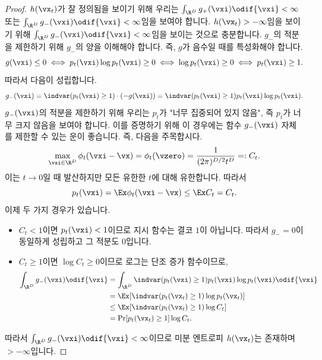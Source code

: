 \documentclass[../../book-main_ko.tex]{subfiles}
\begin{document}
\begin{proof}
    \(h(\vx_{t})\)가 잘 정의됨을 보이기 위해 우리는 \(\int_{\R^{D}}g_{+}(\vxi)\odif{\vxi} < \infty\) 또는 \(\int_{\R^{D}}g_{-}(\vxi) \odif{\vxi} < \infty\)임을 보여야 합니다. \(h(\vx_{t}) > -\infty\)임을 보이기 위해 \(\int_{\R^{D}}g_{-}(\vxi)\odif{\vxi} < \infty\)임을 보이는 것으로 충분합니다. \(g_{-}\)의 적분을 제한하기 위해 \(g_{-}\)의 양을 이해해야 합니다. 즉, \(g\)가 음수일 때를 특성화해야 합니다.
    \begin{equation}
        g(\vxi) \leq 0 \iff p_{t}(\vxi)\log p_{t}(\vxi) \geq 0 \iff \log p_{t}(\vxi) \geq 0 \iff p_{t}(\vxi) \geq 1.
    \end{equation}
    따라서 다음이 성립합니다.
    \begin{equation}
        g_{-}(\vxi) = \indvar(p_{t}(\vxi) \geq 1)\cdot (-g(\vxi)) = \indvar(p_{t}(\vxi) \geq 1)p_{t}(\vxi)\log p_{t}(\vxi).
    \end{equation}
    \(g_{-}(\vxi)\)의 적분을 제한하기 위해 우리는 \(p_{t}\)가 "너무 집중되어 있지 않음", 즉 \(p_{t}\)가 너무 크지 않음을 보여야 합니다. 이를 증명하기 위해 이 경우에는 함수 \(g_{-}(\vxi)\) 자체를 제한할 수 있는 운이 좋습니다. 즉, 다음을 주목합시다.
    \begin{equation}
        \max_{\vxi \in \R^{D}}\phi_{t}(\vxi - \vx) = \phi_{t}(\vzero) = \frac{1}{(2\pi)^{D/2}t^{D}} =: C_{t}.
    \end{equation}
    이는 \(t \to 0\)일 때 발산하지만 모든 유한한 \(t\)에 대해 유한합니다. 따라서
    \begin{equation}
        p_{t}(\vxi) = \Ex \phi_{t}(\vxi - \vx) \leq \Ex C_{t} = C_{t}.
    \end{equation}
    이제 두 가지 경우가 있습니다.
    \begin{itemize}
        \item \(C_{t} < 1\)이면 \(p_{t}(\vxi) < 1\)이므로 지시 함수는 결코 \(1\)이 아닙니다. 따라서 \(g_{-} = 0\)이 동일하게 성립하고 그 적분도 \(0\)입니다.
        \item \(C_{t} \geq 1\)이면 \(\log C_{t} \geq 0\)이므로 로그는 단조 증가 함수이므로,
        \begin{align}
            \int_{\R^{D}}g_{-}(\vxi)\odif{\vxi}
            &= \int_{\R^{D}}\indvar(p_{t}(\vxi) \geq 1)p_{t}(\vxi)\log p_{t}(\vxi)\odif{\vxi} \\
            &= \Ex[\indvar(p_{t}(\vx_{t}) \geq 1)\log p_{t}(\vx_{t})] \\
            &\leq \Ex[\indvar(p_{t}(\vx_{t}) \geq 1) \log C_{t}] \\
            &= \Pr[p_{t}(\vx_{t}) \geq 1]\log C_{t}.
        \end{align}
    \end{itemize}
    따라서 \(\int_{\R^{D}}g_{-}(\vxi)\odif{\vxi} < \infty\)이므로 미분 엔트로피 \(h(\vx_{t})\)는 존재하며 \(> -\infty\)입니다.


\end{proof}
\end{document}
